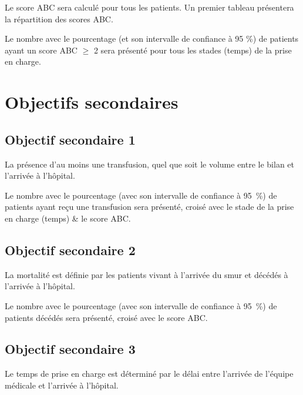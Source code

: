 \documentclass[
  a4paper,
  french]{scrreprt}
\begin{document}
Le score ABC sera calculé pour tous les patients. Un premier tableau
présentera la répartition des scores ABC.

Le nombre avec le pourcentage (et son intervalle de confiance à 95 \%)
de patients ayant un score ABC \(\geq\) 2 sera présenté pour tous les
stades (temps) de la prise en charge.

\chapter{Objectifs secondaires}\label{objectifs-secondaires}

\section{Objectif secondaire 1}\label{objectif-secondaire-1}

\begin{tcolorbox}
La présence d’au moins une transfusion, quel que soit le volume entre le bilan et l’arrivée à l’hôpital.
\end{tcolorbox}

Le nombre avec le pourcentage (avec son intervalle de confiance à
\qty{95}{\percent}) de patients ayant reçu une transfusion sera
présenté, croisé avec le stade de la prise en charge (temps) \& le score
ABC.

\section{Objectif secondaire 2}\label{objectif-secondaire-2}

\begin{tcolorbox}
La mortalité est définie par les patients vivant à l’arrivée du \gls{smur} et décédés à l’arrivée à l’hôpital.
\end{tcolorbox}

Le nombre avec le pourcentage (avec son intervalle de confiance à
\qty{95}{\percent}) de patients décédés sera présenté, croisé avec le
score ABC.

\section{Objectif secondaire 3}\label{objectif-secondaire-3}

\begin{tcolorbox}
Le temps de prise en charge est déterminé par le délai entre l’arrivée de l’équipe médicale et l’arrivée à l’hôpital.
\end{tcolorbox}
\end{document}
